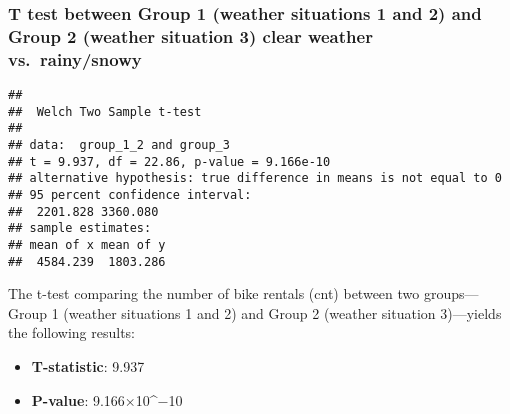 \documentclass[
]{article}
\newenvironment{Shaded}{\begin{snugshade}}{\end{snugshade}}
\newcommand{\AttributeTok}[1]{\textcolor[rgb]{0.13,0.29,0.53}{#1}}
\newcommand{\CommentTok}[1]{\textcolor[rgb]{0.56,0.35,0.01}{\textit{#1}}}
\newcommand{\ConstantTok}[1]{\textcolor[rgb]{0.56,0.35,0.01}{#1}}
\newcommand{\DecValTok}[1]{\textcolor[rgb]{0.00,0.00,0.81}{#1}}
\newcommand{\FunctionTok}[1]{\textcolor[rgb]{0.13,0.29,0.53}{\textbf{#1}}}
\newcommand{\NormalTok}[1]{#1}
\newcommand{\OtherTok}[1]{\textcolor[rgb]{0.56,0.35,0.01}{#1}}
\newcommand{\SpecialCharTok}[1]{\textcolor[rgb]{0.81,0.36,0.00}{\textbf{#1}}}
\begin{document}
\subsubsection{T test between Group 1 (weather situations 1 and 2) and
Group 2 (weather situation 3) clear weather
vs.~rainy/snowy}\label{t-test-between-group-1-weather-situations-1-and-2-and-group-2-weather-situation-3-clear-weather-vs.-rainysnowy}

\begin{Shaded}
\end{Shaded}

\begin{verbatim}
## 
##  Welch Two Sample t-test
## 
## data:  group_1_2 and group_3
## t = 9.937, df = 22.86, p-value = 9.166e-10
## alternative hypothesis: true difference in means is not equal to 0
## 95 percent confidence interval:
##  2201.828 3360.080
## sample estimates:
## mean of x mean of y 
##  4584.239  1803.286
\end{verbatim}

The t-test comparing the number of bike rentals (cnt) between two
groups---Group 1 (weather situations 1 and 2) and Group 2 (weather
situation 3)---yields the following results:

\begin{itemize}
\item
  \textbf{T-statistic}: 9.937
\item
  \textbf{P-value}: 9.166×10\^{}−10
\end{itemize}
\end{document}
